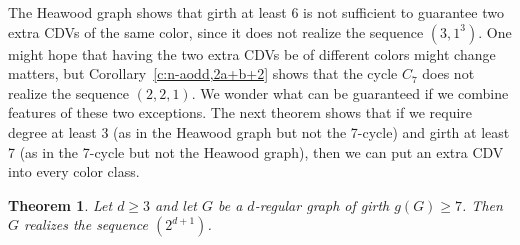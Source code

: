 \documentclass{article}
\newtheorem{theorem}{Theorem}[section]
\theoremstyle{definition}
\begin{document}
\medskip

The Heawood graph shows that girth at least $6$ is not sufficient to guarantee two extra CDVs of the same color, since it does not realize the sequence $(3,1^3)$.
One might hope that having the two extra CDVs be of different colors might change matters, but Corollary~\ref{c:n-aodd,2a+b+2} shows that the cycle $C_7$ does not realize the sequence $(2,2,1)$.
We wonder what can be guaranteed if we combine features of these two exceptions.
The next theorem shows that if we require degree at least 3 (as in the Heawood graph but not the 7-cycle) and girth at least 7 (as in the 7-cycle but not the Heawood graph), then we can put an extra CDV into every color class.

\begin{theorem}\label{t:girth7}
Let $d\ge 3$ and let $G$ be a $d$-regular graph of girth $g(G) \ge 7$.
Then $G$ realizes the sequence $(2^{d+1})$.
\end{theorem}
\end{document}
